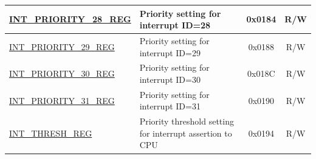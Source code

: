 \begin{longtable}{ | p{4.0cm} | p{8.4cm} | c | c| }
\hyperref[regdesc:INTPRIORITYREG]{INT\_PRIORITY\_28\_REG} & Priority setting for interrupt ID=28 & 0x0184 & R/W \\\hline
\hyperref[regdesc:INTPRIORITYREG]{INT\_PRIORITY\_29\_REG} & Priority setting for interrupt ID=29 & 0x0188 & R/W \\\hline
\hyperref[regdesc:INTPRIORITYREG]{INT\_PRIORITY\_30\_REG} & Priority setting for interrupt ID=30 & 0x018C & R/W \\\hline
\hyperref[regdesc:INTPRIORITYREG]{INT\_PRIORITY\_31\_REG} & Priority setting for interrupt ID=31 & 0x0190 & R/W \\\hline
\hyperref[regdesc:INTTHRESHREG]{INT\_THRESH\_REG} & Priority threshold setting for interrupt assertion to CPU & 0x0194 & R/W \\\hline
\end{longtable}
